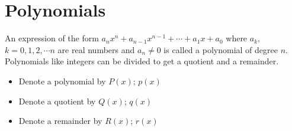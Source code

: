 \documentclass[11pt,a4paper]{article}
\theoremstyle{definition}
\begin{document}
\pagebreak
\section{Polynomials}
An expression of the form $a_nx^n+a_{n-1}x^{n-1}+\cdots+a_1x+a_0$ where $a_k,$ $k=0,1,2,\cdots n$ are real numbers and $a_n\neq 0$ is called a polynomial of degree $n$.\\
Polynomials like integers can be divided to get a quotient and a remainder.
\begin{itemize}
\item Denote a polynomial by $P(x)$; $p(x)$
\item Denote a quotient by $Q(x)$; $q(x)$
\item Denote a remainder by $R(x)$; $r(x)$\\
\end{itemize}
\end{document}
